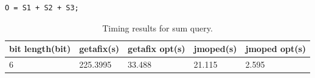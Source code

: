 \lstset{language=C}  
\begin{lstlisting}[caption={Sum query test program.},label=lst:sum]
O = S1 + S2 + S3;
\end{lstlisting}

\begin{table}[htbp]
\begin{tabular}{|l|l|l|l|l|}
\hline
{bit length(bit)} & getafix(s) & {getafix opt(s)} & jmoped(s) & {jmoped opt(s)} \\ \hline
6 & 225.3995 & 33.488 & 21.115 & 2.595	\\ \hline
\end{tabular}
\caption{Timing results for sum query.}
\label{tbl:sum}
\end{table}
